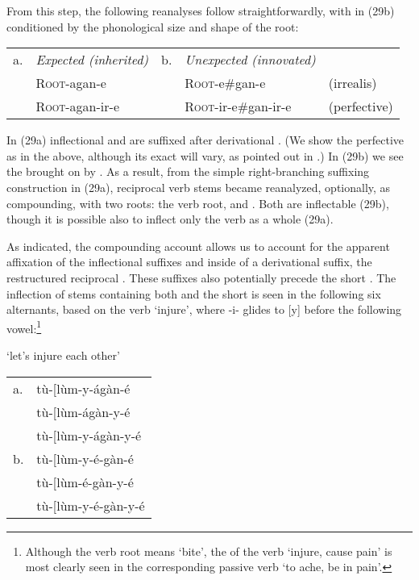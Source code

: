 \documentclass[output=paper,
modfonts
]{LSP/langsci}
\begin{document}
\noindent From this step, the following  reanalyses follow
straightforwardly, with   in (29b) conditioned by the
phonological size and shape of the root:

\ea\begin{tabular}[t]{@{}llrll}
a. & \emph{Expected (inherited)} & b. & \emph{Unexpected (innovated)} & \\
& \textsc{Root}-agan-e & & \textsc{Root}-e\#gan-e & (irrealis) \\
 & \textsc{Root}-agan-ir-e & & \textsc{Root}-ir-e\#gan-ir-e & (perfective)
 \end{tabular}
 \z

\noindent In (29a) inflectional  and  are suffixed after
derivational . (We show the perfective as  in
the above, although its exact  will vary, as pointed out in
.) In (29b) we see the  brought on by . As a
result, from the simple right-branching suffixing construction in (29a),
reciprocal verb stems became reanalyzed, optionally, as compounding,
with two roots: the verb root, and . Both are inflectable
(29b), though it is possible also to inflect only the verb  as a
whole (29a).

As indicated, the compounding account allows us to account for the
apparent affixation of the inflectional suffixes  and
 inside of a derivational suffix, the restructured
reciprocal . These suffixes also potentially precede the
short  . The inflection of stems containing both
 and the short  is seen in the following six
alternants, based on the  verb  `injure', where
-i- glides to {[}y{]} before the following vowel:\footnote{Although the
  verb root  means `bite', the  of the 
   verb  `injure, cause pain' is most clearly
  seen in the corresponding  passive verb  `to
  ache, be in pain'.}

\ea \label{ex:hyman:30}`let's injure each other'\\
\begin{tabular}{@{}ll}
a. &  tù-{[}lùm-y-ágàn-é \\
 &	tù-{[}lùm-ágàn-y-é \\
 &	tù-{[}lùm-y-ágàn-y-é  \\
b. &  tù-{[}lùm-y-é-gàn-é  \\
 &	tù-{[}lùm-é-gàn-y-é \\
 & 	tù-{[}lùm-y-é-gàn-y-é \\
\end{tabular}
\z
\end{document}
